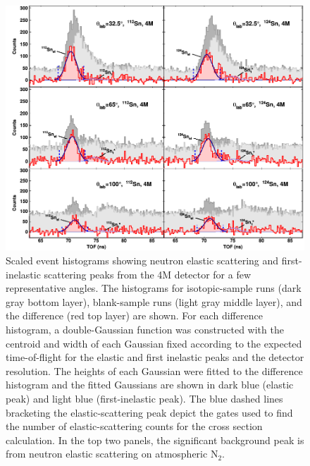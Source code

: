 \begin{figure}[ht]
    \centering
    \includegraphics[width = 1.0\textwidth]{figures/tiledAngleData.png}
    \caption[Scaled event histograms showing neutron elastic scattering peak]
    {
        Scaled event histograms showing neutron elastic scattering
        and first-inelastic scattering peaks from the
        4M detector for a few representative angles. The
        histograms for isotopic-sample runs (dark gray bottom layer),
        blank-sample runs (light gray middle layer), and the difference (red
        top layer) are shown.
        For each difference histogram, a double-Gaussian function
        was constructed with the centroid and width of each Gaussian fixed
        according to the expected time-of-flight for the elastic and first
        inelastic peaks and the detector resolution. The heights of each
        Gaussian were fitted to the difference histogram and the fitted
        Gaussians are shown in dark blue (elastic peak) and light blue
        (first-inelastic peak). The blue dashed lines bracketing the
        elastic-scattering peak depict the gates used to find the number of
        elastic-scattering counts for the cross section calculation.
        In the top two panels, the significant background peak 
        is from neutron elastic scattering on atmospheric N$_{2}$.
    }
    \label{tiledAngleData}
\end{figure}


